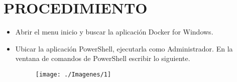 \section{PROCEDIMIENTO} 

\begin{itemize}
\subsection{Parte 1: Iniciando Docker}
	\item Abrir el menu inicio y buscar la aplicación Docker for Windows.

	\item Ubicar la aplicación PowerShell, ejecutarla como Administrador. En la ventana de comandos de PowerShell escribir
lo siguiente.
		\begin{figure}[H]
		\begin{center}
		\texttt{[image: ./Imagenes/1]}
		\end{center}
		\end{figure}
     

\end{itemize}
